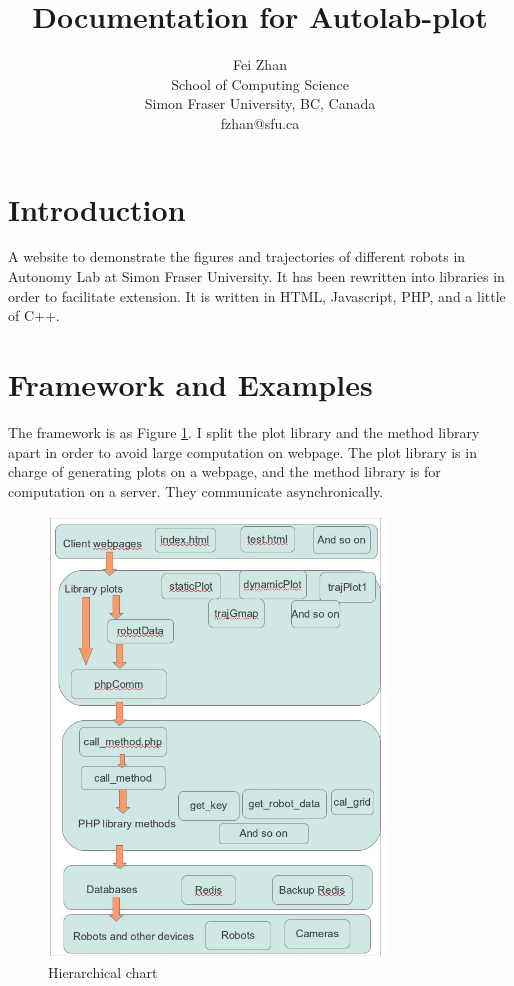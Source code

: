 \documentclass{article}
\begin{document}
\title{Documentation for Autolab-plot}
\author{Fei Zhan \\ School of Computing Science \\ Simon Fraser University, BC, Canada \\ fzhan@sfu.ca}
\maketitle

\section{Introduction}
A website to demonstrate the figures and trajectories of different robots in Autonomy Lab at Simon Fraser University.
It has been rewritten into libraries in order to facilitate extension.
It is written in HTML, Javascript, PHP, and a little of C++.

\section{Framework and Examples}
The framework is as Figure \ref{hier}.
I split the plot library and the method library apart in order to avoid large computation on webpage.
The plot library is in charge of generating plots on a webpage, and the method library is for computation on a server.
They communicate asynchronically.

\begin{figure}
\centering
\includegraphics[width=0.8\textwidth]{diagram.jpg}
\caption{Hierarchical chart}
\label{hier}
\end{figure}
\end{document}
